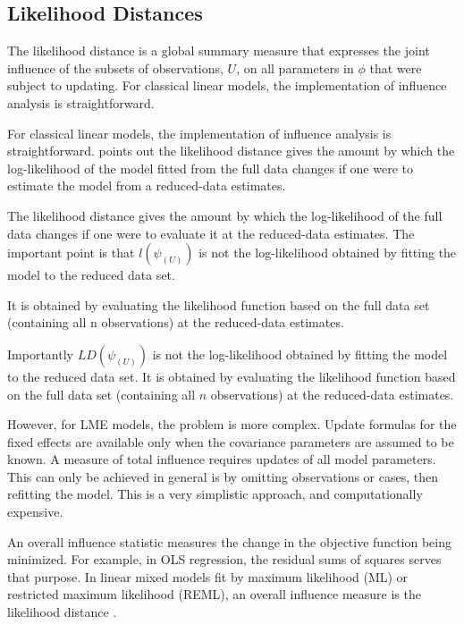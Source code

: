 \documentclass[12pt, a4paper]{report}
\theoremstyle{plain}
\theoremstyle{definition}
\theoremstyle{remark}
\begin{document}
	

	\subsection{Likelihood Distances}
	
	The  likelihood distance is a global summary measure that expresses the joint influence of the subsets of observations, $U$, on all parameters in $\phi$ that were subject to updating. For classical linear models, the implementation of influence analysis is straightforward. 
	
	
	For classical linear models, the implementation of influence analysis is straightforward. \citet{schabenberger} points out the likelihood distance gives the amount by which the log-likelihood of the model fitted from the full data changes if one were
	to estimate the model from a reduced-data estimates. 
	
	The likelihood distance gives the amount by which the log-likelihood of the full data changes if one were to evaluate it at the reduced-data estimates. The important point is that $l(\psi_{(U)})$ is not the log-likelihood obtained by fitting the model to the reduced data set.
	
	It is obtained by evaluating the likelihood function based on the full data set (containing all n observations) at the reduced-data estimates.
	
	
	
	
	Importantly $LD(\psi_{(U)})$ is not the log-likelihood obtained by fitting the model to the reduced data set. It is obtained by evaluating the likelihood function based on the full data set (containing all $n$ observations) at the reduced-data estimates.
	
	
	However, for LME models, the problem is more complex. Update formulas for the fixed effects are available only when the covariance parameters are assumed to be known. A measure of total influence requires updates of all model parameters. This can only be achieved in general is by omitting observations or cases, then refitting the model. This is a very simplistic approach, and computationally expensive.
	
	
	
	An overall influence statistic measures the change in the objective function being minimized. For example, in
	OLS regression, the residual sums of squares serves that purpose. In linear mixed models fit by
	 maximum likelihood (ML) or  restricted maximum likelihood (REML), an overall influence measure is the  likelihood distance \citep{cook}. 
	
\end{document}
